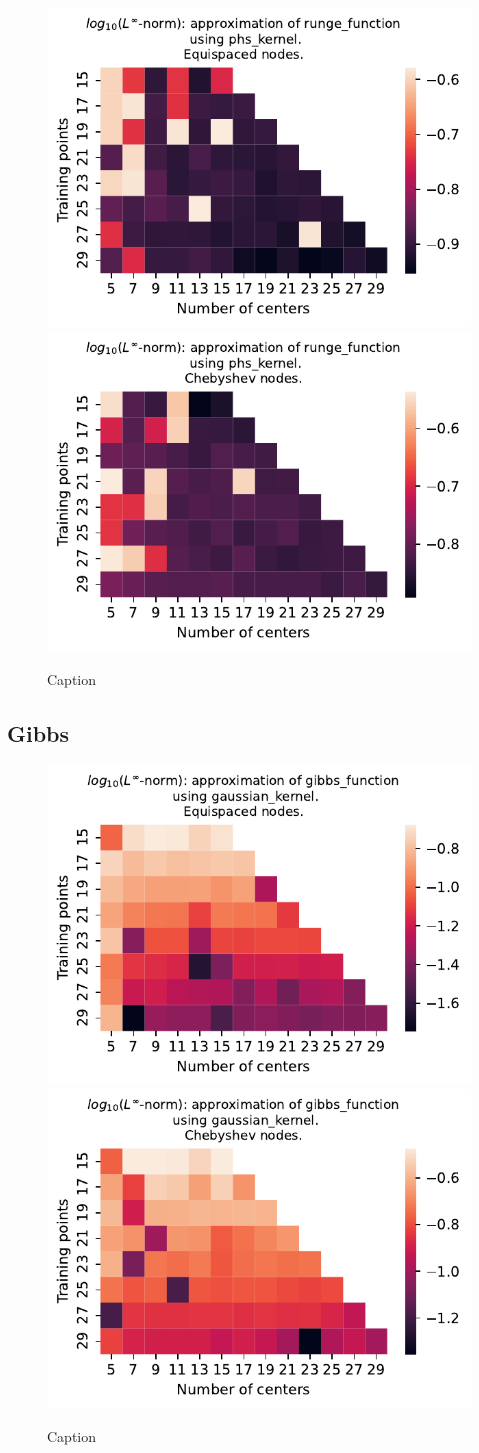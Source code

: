 \documentclass[12pt]{report} %
\begin{document}
\begin{figure}[ht]
    \centering
    
    \includegraphics[width=.49\textwidth]{imagenes/experiments/1d/variational/runge_function-Kphs_kernel-Equi.pdf}
    \includegraphics[width=.49\textwidth]{imagenes/experiments/1d/variational/runge_function-Kphs_kernel-Cheb.pdf}
    \caption{Caption}
    \label{fig:runge-phs}
\end{figure}


\subsection*{Gibbs}

\begin{figure}[ht]
    \centering
    
    \includegraphics[width=.49\textwidth]{imagenes/experiments/1d/variational/gibbs_function-Kgaussian_kernel-Equi.pdf}
    \includegraphics[width=.49\textwidth]{imagenes/experiments/1d/variational/gibbs_function-Kgaussian_kernel-Cheb.pdf}
    \caption{Caption}
    \label{fig:gibbs-gaussian}
\end{figure}
\end{document}
